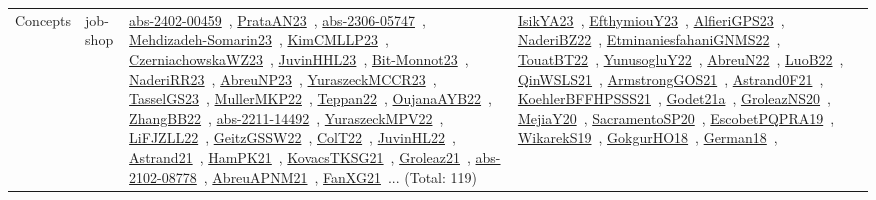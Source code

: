 {\begin{longtable}{lp{3cm}>{\raggedright\arraybackslash}p{6cm}>{\raggedright\arraybackslash}p{6cm}>{\raggedright\arraybackslash}p{8cm}}
Concepts & job-shop & \href{works/abs-2402-00459.pdf}{abs-2402-00459}~\cite{abs-2402-00459}, \href{works/PrataAN23.pdf}{PrataAN23}~\cite{PrataAN23}, \href{works/abs-2306-05747.pdf}{abs-2306-05747}~\cite{abs-2306-05747}, \href{works/Mehdizadeh-Somarin23.pdf}{Mehdizadeh-Somarin23}~\cite{Mehdizadeh-Somarin23}, \href{works/KimCMLLP23.pdf}{KimCMLLP23}~\cite{KimCMLLP23}, \href{works/CzerniachowskaWZ23.pdf}{CzerniachowskaWZ23}~\cite{CzerniachowskaWZ23}, \href{works/JuvinHHL23.pdf}{JuvinHHL23}~\cite{JuvinHHL23}, \href{works/Bit-Monnot23.pdf}{Bit-Monnot23}~\cite{Bit-Monnot23}, \href{works/NaderiRR23.pdf}{NaderiRR23}~\cite{NaderiRR23}, \href{works/AbreuNP23.pdf}{AbreuNP23}~\cite{AbreuNP23}, \href{works/YuraszeckMCCR23.pdf}{YuraszeckMCCR23}~\cite{YuraszeckMCCR23}, \href{works/TasselGS23.pdf}{TasselGS23}~\cite{TasselGS23}, \href{works/MullerMKP22.pdf}{MullerMKP22}~\cite{MullerMKP22}, \href{works/Teppan22.pdf}{Teppan22}~\cite{Teppan22}, \href{works/OujanaAYB22.pdf}{OujanaAYB22}~\cite{OujanaAYB22}, \href{works/ZhangBB22.pdf}{ZhangBB22}~\cite{ZhangBB22}, \href{works/abs-2211-14492.pdf}{abs-2211-14492}~\cite{abs-2211-14492}, \href{works/YuraszeckMPV22.pdf}{YuraszeckMPV22}~\cite{YuraszeckMPV22}, \href{works/LiFJZLL22.pdf}{LiFJZLL22}~\cite{LiFJZLL22}, \href{works/GeitzGSSW22.pdf}{GeitzGSSW22}~\cite{GeitzGSSW22}, \href{works/ColT22.pdf}{ColT22}~\cite{ColT22}, \href{works/JuvinHL22.pdf}{JuvinHL22}~\cite{JuvinHL22}, \href{works/Astrand21.pdf}{Astrand21}~\cite{Astrand21}, \href{works/HamPK21.pdf}{HamPK21}~\cite{HamPK21}, \href{works/KovacsTKSG21.pdf}{KovacsTKSG21}~\cite{KovacsTKSG21}, \href{works/Groleaz21.pdf}{Groleaz21}~\cite{Groleaz21}, \href{works/abs-2102-08778.pdf}{abs-2102-08778}~\cite{abs-2102-08778}, \href{works/AbreuAPNM21.pdf}{AbreuAPNM21}~\cite{AbreuAPNM21}, \href{works/FanXG21.pdf}{FanXG21}~\cite{FanXG21}... (Total: 119) & \href{works/IsikYA23.pdf}{IsikYA23}~\cite{IsikYA23}, \href{works/EfthymiouY23.pdf}{EfthymiouY23}~\cite{EfthymiouY23}, \href{works/AlfieriGPS23.pdf}{AlfieriGPS23}~\cite{AlfieriGPS23}, \href{works/NaderiBZ22.pdf}{NaderiBZ22}~\cite{NaderiBZ22}, \href{works/EtminaniesfahaniGNMS22.pdf}{EtminaniesfahaniGNMS22}~\cite{EtminaniesfahaniGNMS22}, \href{works/TouatBT22.pdf}{TouatBT22}~\cite{TouatBT22}, \href{works/YunusogluY22.pdf}{YunusogluY22}~\cite{YunusogluY22}, \href{works/AbreuN22.pdf}{AbreuN22}~\cite{AbreuN22}, \href{works/LuoB22.pdf}{LuoB22}~\cite{LuoB22}, \href{works/QinWSLS21.pdf}{QinWSLS21}~\cite{QinWSLS21}, \href{works/ArmstrongGOS21.pdf}{ArmstrongGOS21}~\cite{ArmstrongGOS21}, \href{works/Astrand0F21.pdf}{Astrand0F21}~\cite{Astrand0F21}, \href{works/KoehlerBFFHPSSS21.pdf}{KoehlerBFFHPSSS21}~\cite{KoehlerBFFHPSSS21}, \href{works/Godet21a.pdf}{Godet21a}~\cite{Godet21a}, \href{works/GroleazNS20.pdf}{GroleazNS20}~\cite{GroleazNS20}, \href{works/MejiaY20.pdf}{MejiaY20}~\cite{MejiaY20}, \href{works/SacramentoSP20.pdf}{SacramentoSP20}~\cite{SacramentoSP20}, \href{works/EscobetPQPRA19.pdf}{EscobetPQPRA19}~\cite{EscobetPQPRA19}, \href{works/WikarekS19.pdf}{WikarekS19}~\cite{WikarekS19}, \href{works/GokgurHO18.pdf}{GokgurHO18}~\cite{GokgurHO18}, \href{works/German18.pdf}{German18}~\cite{German18}, 
\end{longtable}}
